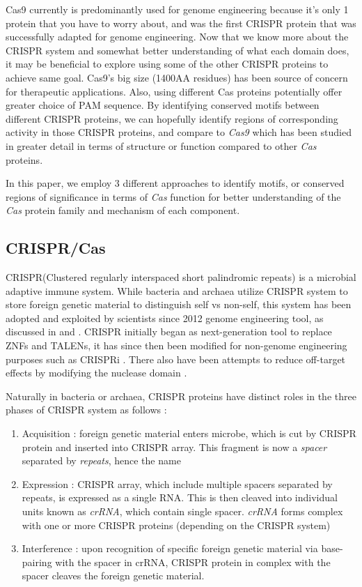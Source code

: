 \documentclass[11pt, oneside]{article}
\begin{document}
Cas9 currently is predominantly used for genome engineering because it's only 1 protein that you have to worry about, and was the first CRISPR protein that was successfully adapted for genome engineering. Now that we know more about the CRISPR system and somewhat better understanding of what each domain does, it may be beneficial to explore using some of the other CRISPR proteins to achieve same goal. Cas9's big size (1400AA residues) has been source of concern for therapeutic applications. Also, using different Cas proteins potentially offer greater choice of PAM sequence. By identifying conserved motifs between different CRISPR proteins, we can hopefully identify regions of corresponding activity in those CRISPR proteins, and compare to \textit{Cas9} which has been studied in greater detail in terms of structure\cite{cas9structure} or function\cite{mali} compared to other \textit{Cas} proteins. 

 In this paper, we employ 3 different approaches to identify motifs, or conserved regions of significance in terms of \textit{Cas} function for better understanding of the \textit{Cas} protein family and mechanism of each component. 

\subsection{CRISPR/Cas} 

CRISPR(Clustered regularly interspaced short palindromic repeats) is a microbial adaptive immune system. While bacteria and archaea utilize CRISPR system to store foreign genetic material to distinguish self vs non-self, this system has been adopted and exploited by scientists since 2012 genome engineering tool, as discussed in \cite{jenniferdoudna} and \cite{fengzhang}. CRISPR initially began as next-generation tool to replace ZNFs and TALENs, it has since then been modified for non-genome engineering purposes such as CRISPRi \cite{stanleyqi}. There also have been attempts to reduce off-target effects by modifying the nuclease domain\cite{doublenick} . 

Naturally in bacteria or archaea, CRISPR proteins have distinct roles in the three phases of CRISPR system as follows : 
\begin{enumerate}
\item Acquisition : foreign genetic material enters microbe, which is cut by CRISPR protein and inserted into CRISPR array. This fragment is now a \textit{spacer} separated by \textit{repeats}, hence the name
\item Expression : CRISPR array, which include multiple spacers separated by repeats, is expressed as a single RNA. This is then cleaved into individual units known as \textit{crRNA}, which contain single spacer. \textit{crRNA} forms complex with one or more CRISPR proteins (depending on the CRISPR system)
\item Interference : upon recognition of specific foreign genetic material via base-pairing with the spacer in crRNA, CRISPR protein in complex with the spacer cleaves the foreign genetic material. 
\end{enumerate}
\end{document}

